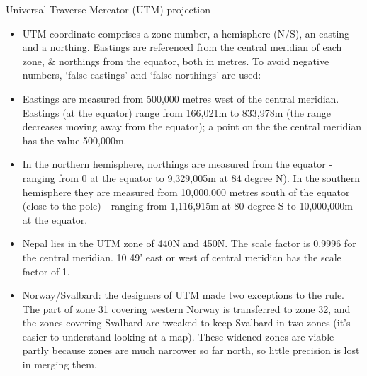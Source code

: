 \documentclass[11pt,dvipsnames,ignorenonframetext,aspectratio=169]{beamer}
\providecommand{\tightlist}{%
  \setlength{\itemsep}{0pt}\setlength{\parskip}{0pt}}
\begin{document}
\begin{frame}{Universal Traverse Mercator (UTM) projection}
\protect\hypertarget{universal-traverse-mercator-utm-projection}{}
\footnotesize

\begin{itemize}
\tightlist
\item
  UTM coordinate comprises a zone number, a hemisphere (N/S), an easting
  and a northing. Eastings are referenced from the central meridian of
  each zone, \& northings from the equator, both in metres. To avoid
  negative numbers, `false eastings' and `false northings' are used:
\item
  Eastings are measured from 500,000 metres west of the central
  meridian. Eastings (at the equator) range from 166,021m to 833,978m
  (the range decreases moving away from the equator); a point on the the
  central meridian has the value 500,000m.
\item
  In the northern hemisphere, northings are measured from the equator -
  ranging from 0 at the equator to 9,329,005m at 84 degree N). In the
  southern hemisphere they are measured from 10,000,000 metres south of
  the equator (close to the pole) - ranging from 1,116,915m at 80 degree
  S to 10,000,000m at the equator.
\item
  Nepal lies in the UTM zone of 440N and 450N. The scale factor is
  0.9996 for the central meridian. 10 49' east or west of central
  meridian has the scale factor of 1.
\end{itemize}

\scriptsize

\begin{itemize}
\tightlist
\item
  Norway/Svalbard: the designers of UTM made two exceptions to the rule.
  The part of zone 31 covering western Norway is transferred to zone 32,
  and the zones covering Svalbard are tweaked to keep Svalbard in two
  zones (it's easier to understand looking at a map). These widened
  zones are viable partly because zones are much narrower so far north,
  so little precision is lost in merging them.
\end{itemize}
\end{frame}
\end{document}
